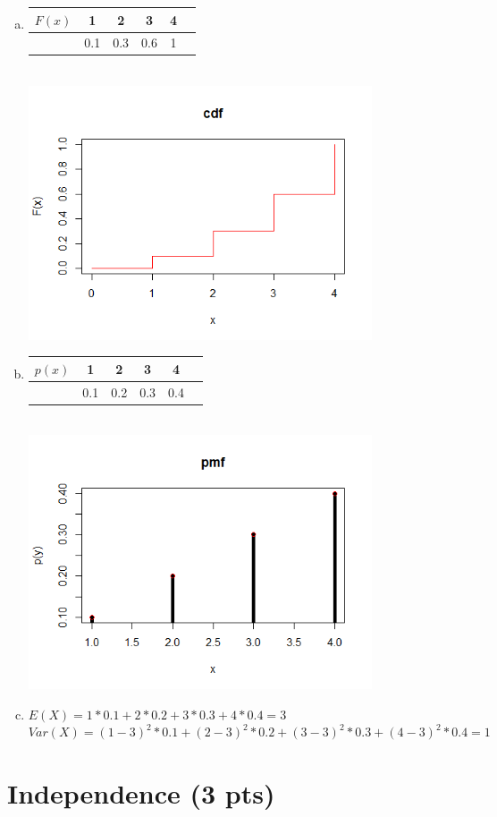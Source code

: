 \documentclass[11pt]{article}
\begin{document}
\begin{enumerate}[(a)]
  \item 
  	\begin{tabular}{ c c c c c c }
  		$F(x)$ & 1 & 2 & 3 & 4\\ \hline 
  				& 0.1 & 0.3 &0.6&1
	\end{tabular}\\
  	\includegraphics[width=4in]{cdf.png}
  \item 
	\begin{tabular}{ c c c c c c }
  		$p(x)$ & 1 & 2 & 3 & 4\\ \hline 
  				& 0.1 & 0.2 &0.3&0.4
	\end{tabular}  \\
    \includegraphics[width=4in]{pmf.png}
  \item $E(X) = 1*0.1 +2*0.2 +3*0.3 + 4*0.4 = 3$\\
  $Var(X) = (1-3)^2*0.1 + (2-3)^2*0.2 + (3-3)^2*0.3+(4-3)^2*0.4 = 1$
\end{enumerate}


\section{Independence (3 pts)}
\end{document}
